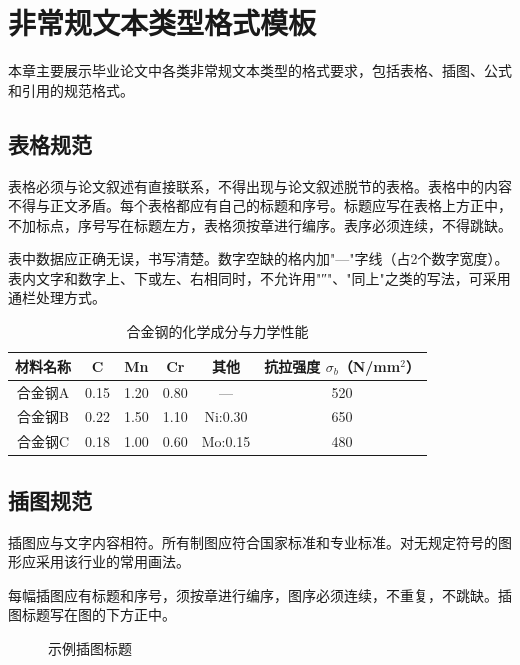 
\chapter{非常规文本类型格式模板}

本章主要展示毕业论文中各类非常规文本类型的格式要求，包括表格、插图、公式和引用的规范格式。

\section{表格规范}

表格必须与论文叙述有直接联系，不得出现与论文叙述脱节的表格。表格中的内容不得与正文矛盾。每个表格都应有自己的标题和序号。标题应写在表格上方正中，不加标点，序号写在标题左方，表格须按章进行编序。表序必须连续，不得跳缺。

表中数据应正确无误，书写清楚。数字空缺的格内加"—"字线（占2个数字宽度）。表内文字和数字上、下或左、右相同时，不允许用"″"、"同上"之类的写法，可采用通栏处理方式。

\begin{table}[htbp]
  \centering
  \caption{合金钢的化学成分与力学性能}
  \label{tab:alloy}
  \begin{tabular}{cccccc}
    \toprule
    材料名称 & C & Mn & Cr & 其他 & 抗拉强度 $\sigma_b$（N/mm$^2$） \\
    \midrule
    合金钢A & 0.15 & 1.20 & 0.80 & — & 520 \\
    合金钢B & 0.22 & 1.50 & 1.10 & Ni:0.30 & 650 \\
    合金钢C & 0.18 & 1.00 & 0.60 & Mo:0.15 & 480 \\
    \bottomrule
  \end{tabular}
\end{table}

\section{插图规范}

插图应与文字内容相符。所有制图应符合国家标准和专业标准。对无规定符号的图形应采用该行业的常用画法。

每幅插图应有标题和序号，须按章进行编序，图序必须连续，不重复，不跳缺。插图标题写在图的下方正中。

\begin{figure}[htbp]
  \centering
  \caption{示例插图标题}
  \label{fig:example}
\end{figure}

